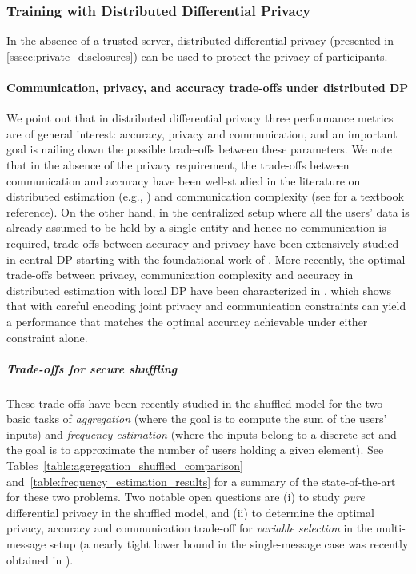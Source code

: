\documentclass[11pt]{article}
\begin{document}
\subsubsection{Training with Distributed Differential Privacy}
\label{sssec:distributed_dp}
In the absence of a trusted server, distributed differential privacy (presented in \cref{sssec:private_disclosures}) can be used to protect the privacy of participants. 

\paragraph{Communication, privacy, and accuracy trade-offs under distributed DP} 
We point out that in distributed differential privacy three performance metrics are of general interest: accuracy, privacy and communication, and an important goal is nailing down the possible trade-offs between these parameters. We note that in the absence of the privacy requirement, the trade-offs between communication and accuracy have been well-studied in the literature on distributed estimation (e.g., \cite{suresh2017distributed}) and communication complexity (see \cite{Kushilevitz_Nisan_cc} for a textbook reference). On the other hand, in the centralized setup where all the users' data is already assumed to be held by a single entity and hence no communication is required, trade-offs between accuracy and privacy have been extensively studied in central DP starting with the foundational work of \cite{DMNS06,dwork2006our}. More recently, the optimal trade-offs between privacy, communication complexity and accuracy in distributed estimation with local DP have been characterized in \cite{ChenKO2020}, which shows that with careful encoding joint privacy and communication constraints can yield a performance that matches the optimal accuracy achievable under either constraint alone.

\subparagraph{Trade-offs for secure shuffling} These trade-offs have been recently studied in the shuffled model for the two basic tasks of \emph{aggregation} (where the goal is to compute the sum of the users' inputs) and \emph{frequency estimation} (where the inputs belong to a discrete set and the goal is to approximate the number of users holding a given element). See Tables~\ref{table:aggregation_shuffled_comparison} and~\ref{table:frequency_estimation_results} for a summary of the state-of-the-art for these two problems. Two notable open questions are (i) to study \emph{pure} differential privacy in the shuffled model, and (ii) to determine the optimal privacy, accuracy and communication trade-off for \emph{variable selection} in the multi-message setup (a nearly tight lower bound in the single-message case was recently obtained in \cite{ghazi2019private}).
\end{document}
